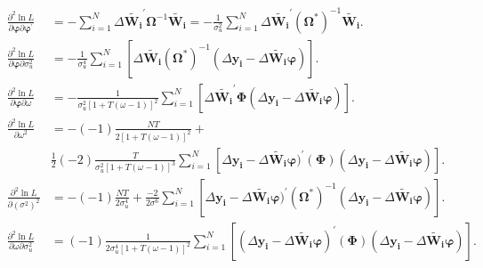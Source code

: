 \documentclass[12pt,a4paper,hyperref]{article}
\begin{document}
\begin{align*}
\frac{\partial^{2} \ln L}{\partial \boldsymbol{\varphi} \partial \boldsymbol{\varphi}^{'}}&= - \sum_{i=1}^{N} \Delta \boldsymbol{\tilde{W_{i}}}^{'} \boldsymbol{\Omega}^{-1} \boldsymbol{\tilde{W_{i}}} =
-\frac{1}{\sigma^{2}_{u}} \sum_{i=1}^{N} \Delta \boldsymbol{\tilde{W_{i}}}^{'} (\boldsymbol{\Omega^{*}})^{-1} \boldsymbol{\tilde{W_{i}}}.
 \\
\frac{\partial^{2} \ln L}{\partial \boldsymbol{\varphi} \partial \sigma^{2}_{u}}&= -\frac{1}{\sigma^{4}_{u}} \sum_{i=1}^{N}[\Delta \boldsymbol{\tilde{W_{i}}} (\boldsymbol{\Omega^{*}})^{-1}(\Delta \boldsymbol{y_{i}}-\Delta \boldsymbol{\tilde{W_{i}}} \boldsymbol{\varphi})]. \\
\frac{\partial^{2} \ln L}{\partial \boldsymbol{\varphi} \partial \omega}&=-\frac{1}{\sigma^{2}_{u}[1+T(\omega-1)]^{2}} \sum_{i=1}^{N}[\Delta \boldsymbol{\tilde{W_{i}}^{'}} \boldsymbol{\Phi}(\Delta \boldsymbol{y_{i}}-\Delta \boldsymbol{\tilde{W_{i}}} \boldsymbol{\varphi})]. \\
\frac{\partial^{2} \ln L}{\partial \omega^{2}} &=-(-1)\frac{NT}{2[1+T(\omega-1)]^{2}}+ \\
&\frac{1}{2}(-2)\frac{T}{\sigma^{2}_{u}[1+T(\omega-1)]^{3}} \sum_{i=1}^{N}[\Delta \boldsymbol{y_{i}}-\Delta \boldsymbol{\tilde{W_{i}}} \boldsymbol{\varphi})^{'}  (\boldsymbol{\Phi}) (\Delta \boldsymbol{y_{i}}-\Delta \boldsymbol{\tilde{W_{i}}} \boldsymbol{\varphi})] .\\
\frac{\partial^{2} \ln L}{\partial (\sigma^{2})^{2}} &=-(-1)\frac{NT}{2\sigma^{4}_{u}}+\frac{-2}{2\sigma^{6}} \sum_{i=1}^{N}[\Delta \boldsymbol{y_{i}}-\Delta \boldsymbol{\tilde{W_{i}}} \boldsymbol{\varphi})^{'}  (\boldsymbol{\Omega^{*}})^{-1} (\Delta \boldsymbol{y_{i}}-\Delta \boldsymbol{\tilde{W_{i}}} \boldsymbol{\varphi})]. \\
\frac{\partial^{2} \ln L}{\partial \omega \partial \sigma^{2}_{u}} &=(-1)\frac{1}{2\sigma^{4}_{u}[1+T(\omega-1)]^{2}} \sum_{i=1}^{N}[(\Delta \boldsymbol{y_{i}}-\Delta \boldsymbol{\tilde{W_{i}}} \boldsymbol{\varphi})^{'}  (\boldsymbol{\Phi}) (\Delta \boldsymbol{y_{i}}-\Delta \boldsymbol{\tilde{W_{i}}} \boldsymbol{\varphi})].
\end{align*}
\end{document}
